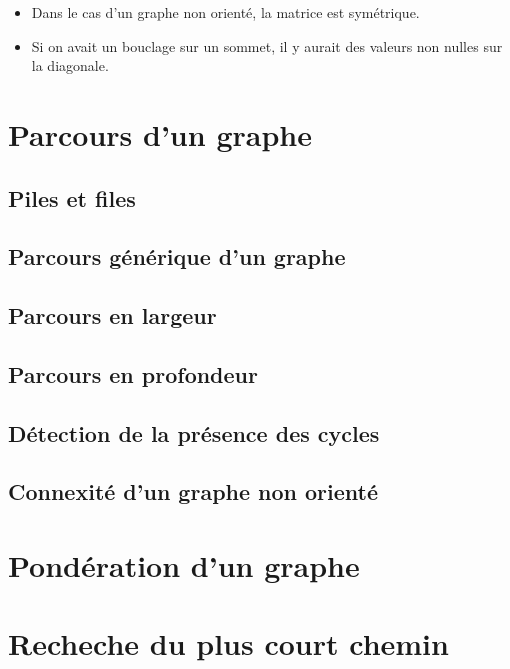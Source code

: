 \begin{rem}
\begin{itemize}
\item Dans le cas d'un graphe non orienté, la matrice est symétrique. 
\item Si on avait un bouclage sur un sommet, il y aurait des valeurs non nulles sur la diagonale. 
\end{itemize}
\end{rem}

\section{Parcours d'un graphe}
\subsection{Piles et files}

\subsection{Parcours générique d'un graphe}

\subsection{Parcours en largeur}

\subsection{Parcours en profondeur}

\subsection{Détection de la présence des cycles}

\subsection{Connexité d'un graphe non orienté}

\section{Pondération d'un graphe}



\section{Recheche du plus court chemin}
